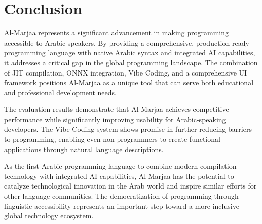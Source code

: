 \documentclass[11pt,a4paper]{article}
\begin{document}
\section{Conclusion}

Al-Marjaa represents a significant advancement in making programming accessible to Arabic speakers. By providing a comprehensive, production-ready programming language with native Arabic syntax and integrated AI capabilities, it addresses a critical gap in the global programming landscape. The combination of JIT compilation, ONNX integration, Vibe Coding, and a comprehensive UI framework positions Al-Marjaa as a unique tool that can serve both educational and professional development needs.

The evaluation results demonstrate that Al-Marjaa achieves competitive performance while significantly improving usability for Arabic-speaking developers. The Vibe Coding system shows promise in further reducing barriers to programming, enabling even non-programmers to create functional applications through natural language descriptions.

As the first Arabic programming language to combine modern compilation technology with integrated AI capabilities, Al-Marjaa has the potential to catalyze technological innovation in the Arab world and inspire similar efforts for other language communities. The democratization of programming through linguistic accessibility represents an important step toward a more inclusive global technology ecosystem.
\end{document}
